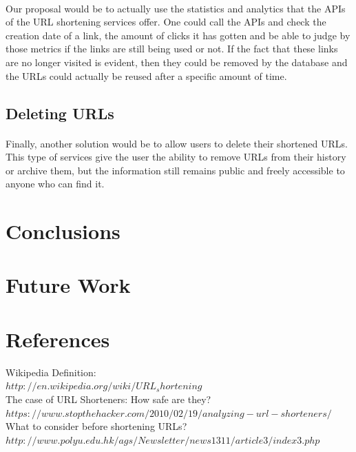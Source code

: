 \documentclass[12pt]{article}
\begin{document}
\paragraph{}
Our proposal would be to actually use the statistics and analytics that the APIs of the URL shortening services offer. One could call the APIs and check the creation date of a link, the amount of clicks it has gotten and be able to judge by those metrics if the links are still being used or not. If the fact that these links are no longer visited is evident, then they could be removed by the database and the URLs could actually be reused after a specific amount of time.

\subsection{Deleting URLs}

\paragraph{}
Finally, another solution would be to allow users to delete their shortened URLs. This type of services give the user the ability to remove URLs from their history or archive them, but the information still remains public and freely accessible to anyone who can find it.

\section{Conclusions}

\section{Future Work}

\section{References}


Wikipedia Definition:\\
$http://en.wikipedia.org/wiki/URL_shortening$
\\

The case of URL Shorteners: How safe are they?\\
$https://www.stopthehacker.com/2010/02/19/analyzing-url-shorteners/$
\\

What to consider before shortening URLs?\\
$http://www.polyu.edu.hk/ags/Newsletter/news1311/article3/index3.php$
\\
\end{document}
